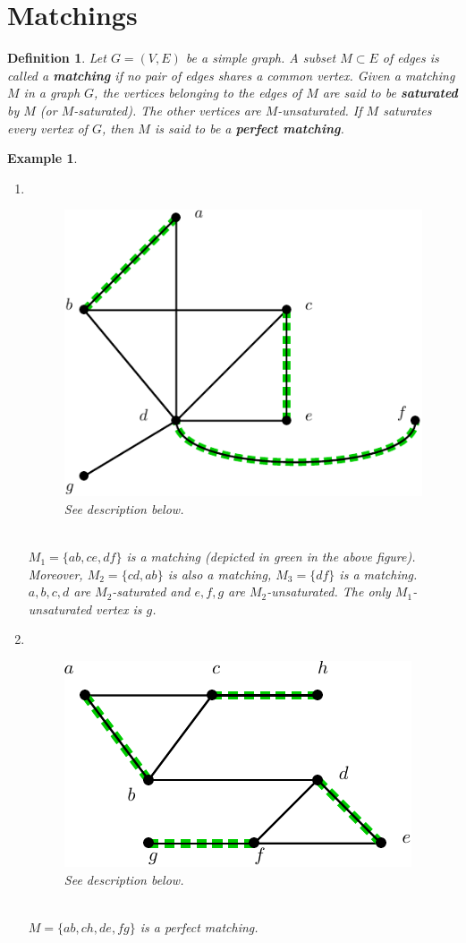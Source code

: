 \documentclass[12pt,a4paper]{article}
\newtheorem{defn}{Definition}[section]
\newtheorem{exmp}{Example}[section]
\theoremstyle{definition}
\begin{document}
\section{Matchings}
\begin{defn} Let $G=(V,E)$ be a simple graph. A subset $M \subset E$ of edges is called a \textbf{matching} if no pair of edges shares a common vertex. Given a matching $M$ in a graph $G$, the vertices belonging to the edges of $M$ are said to be \textbf{saturated} by $M$ (or $M$-saturated). The other vertices are $M$-unsaturated. If $M$ saturates every vertex of $G$, then $M$ is said to be a \textbf{perfect matching}.
\end{defn}
\begin{exmp} \
\begin{enumerate} 
\item \  \begin{figure}[hbtp]
\centering
\includegraphics[scale=.9]{images/graph38.pdf}
\caption{See description below.}
\end{figure} \\
$M_1= \{ab,ce,df\}$ is a matching (depicted in green in the above figure). Moreover, $M_2=\{cd,ab\}$ is also a matching, $M_3= \{df\}$ is a matching. $a,b,c,d$ are $M_2$-saturated and $e,f,g$ are $M_2$-unsaturated. The only $M_1$-unsaturated vertex is $g$. 
\item \
\begin{figure}[hbtp]
\centering
\includegraphics[scale=.9]{images/graph39.pdf}
\caption{See description below.}
\end{figure}
\\ $M= \{ab,ch,de,fg\}$ is a perfect matching. 
\end{enumerate}
\end{exmp}
\end{document}
